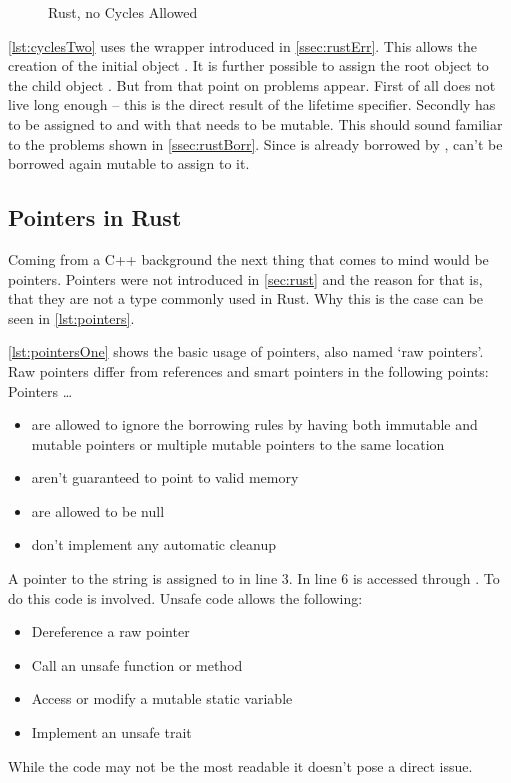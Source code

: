 \documentclass[thesis]{subfiles}
\begin{document}
    \begin{figure}[ht]
      \captionsetup{type=lstlisting}
       \hfill%
      \caption{Rust, no Cycles Allowed}\label{lst:cycles}
    \end{figure}

    \autoref{lst:cyclesTwo} uses the  wrapper introduced in \autoref{ssec:rustErr}.
    This allows the creation of the initial \Node object .
    It is further possible to assign the root object  to the child object .
    But from that point on problems appear.
    First of all does  not live long enough -- this is the direct result of the lifetime specifier.
    Secondly has  to be assigned to  and with that needs  to be mutable.
    This should sound familiar to the problems shown in \autoref{ssec:rustBorr}.
    Since  is already borrowed by ,  can't be borrowed again mutable to assign  to it.

  \subsection{Pointers in Rust}
    Coming from a C++ background the next thing that comes to mind would be pointers.
    Pointers were not introduced in \autoref{sec:rust} and the reason for that is, that they are not a type commonly used in Rust.
    Why this is the case can be seen in \autoref{lst:pointers}.

    \autoref{lst:pointersOne} shows the basic usage of pointers, also named `raw pointers'.
    Raw pointers differ from references and smart pointers in the following points\autocite{rust-book}: Pointers \ldots
    \begin{itemize}
      \item are allowed to ignore the borrowing rules by having both immutable and mutable pointers or multiple mutable pointers to the same location
      \item aren't guaranteed to point to valid memory
      \item are allowed to be null
      \item don’t implement any automatic cleanup
    \end{itemize}
    A pointer to the string  is assigned to  in line 3.
    In line 6  is accessed through .
    To do this  code is involved.
    Unsafe code allows the following\autocite{rust-book}:
    \begin{itemize}
      \item Dereference a raw pointer
      \item Call an unsafe function or method
      \item Access or modify a mutable static variable
      \item Implement an unsafe trait
    \end{itemize}
    While the code may not be the most readable it doesn't pose a direct issue.
\end{document}

